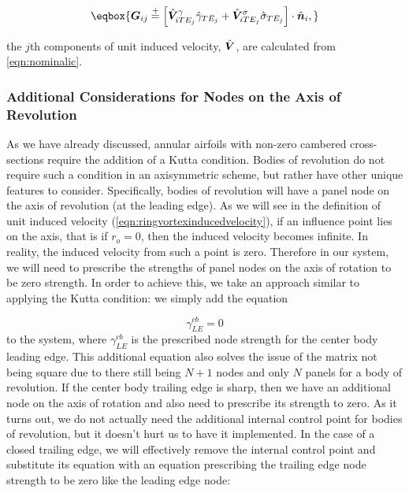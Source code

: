 \begin{equation}
    \label{eqn:teaicaugment}
    \eqbox{
    \vect{G}_{ij} \stackrel{+}{=}  \left[\hat{\vect{V}}^\gamma_{iTE_j}\hat{\gamma}_{TE_j} + \hat{\vect{V}}^\sigma_{iTE_j}\hat{\sigma}_{TE_j}\right]\cdot\hat{\vect{n}}_i,
}
\end{equation}

\where the \(j\)th components of unit induced velocity, \(\hat{\bm{V}}\), are calculated from \cref{eqn:nominalic}.



\subsubsection{Additional Considerations for Nodes on the Axis of Revolution}

As we have already discussed, annular airfoils with non-zero cambered cross-sections require the addition of a Kutta condition.
%
Bodies of revolution do not require such a condition in an axisymmetric scheme, but rather have other unique features to consider.
%
Specifically, bodies of revolution will have a panel node on the axis of revolution (at the leading edge).
%
As we will see in the definition of unit induced velocity (\cref{eqn:ringvortexinducedvelocity}), if an influence point lies on the axis, that is if \(r_o = 0\), then the induced velocity becomes infinite.
%
In reality, the induced velocity from such a point is zero.
%
Therefore in our system, we will need to prescribe the strengths of panel nodes on the axis of rotation to be zero strength.
%
In order to achieve this, we take an approach similar to applying the Kutta condition: we simply add the equation

\begin{equation}
    \gamma_{LE}^{cb} = 0
\end{equation}
%
to the system, where \(\gamma_{LE}^{cb}\) is the prescribed node strength for the center body leading edge.
%
This additional equation also solves the issue of the matrix not being square due to there still being \(N+1\) nodes and only \(N\) panels for a body of revolution.
%
If the center body trailing edge is sharp, then we have an additional node on the axis of rotation and also need to prescribe its strength to zero.
%
As it turns out, we do not actually need the additional internal control point for bodies of revolution, but it doesn't hurt us to have it implemented.
%
In the case of a closed trailing edge, we will effectively remove the internal control point and substitute its equation with an equation prescribing the trailing edge node strength to be zero like the leading edge node:

